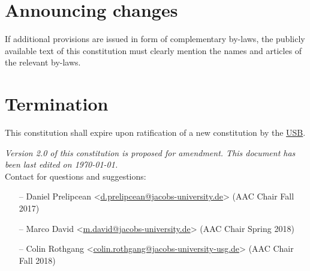 \section{Announcing changes}
If additional provisions are issued in form of complementary by-laws, the publicly available text of this constitution must clearly mention the names and articles of the relevant by-laws.


\section{Termination}
This constitution shall expire upon ratification of a new constitution by the \hyperref[studentbody]{USB}.


\vfill
\nolinenumbers
\emph{Version 2.0 of this constitution is proposed for amendment. This document has been last edited on \today.}\\

Contact for questions and suggestions:
\begin{itemize}[nosep]
\item[--] Daniel Prelipcean <\url{d.prelipcean@jacobs-university.de}> (AAC Chair Fall 2017)
\item[--] Marco David <\url{m.david@jacobs-university.de}> (AAC Chair Spring 2018)
\item[--] Colin Rothgang <\url{colin.rothgang@jacobs-university-usg.de}> (AAC Chair Fall 2018)
\end{itemize}